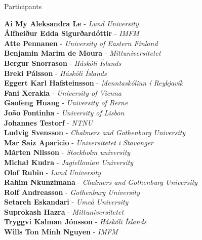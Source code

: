 \documentclass[12pt, openany, twoside]{report}      %
\begin{document}



\newpage



\newpage



\newpage







\newpage
{}

\noindent
{\LARGE Participants}

\bigskip
\bigskip
\noindent
\textbf{Ai My Aleksandra Le} -
\textit{Lund University}
\\
\textbf{Álfheiður Edda Sigurðardóttir} -
\textit{IMFM}
\\
\textbf{Atte Pennanen} -
\textit{University of Eastern Finland}
\\
\textbf{Benjamin Marim de Moura} -
\textit{Mittuniversitetet}
\\
\textbf{Bergur Snorrason} -
\textit{Háskóli Íslands}
\\
\textbf{Breki Pálsson} -
\textit{Háskóli Íslands}
\\
\textbf{Eggert Karl Hafsteinsson} -
\textit{Menntaskólinn í Reykjavík}
\\
\textbf{Fani Xerakia} -
\textit{University of Vienna}
\\
\textbf{Gaofeng Huang} -
\textit{University of Berne}
\\
\textbf{João Fontinha} -
\textit{University of Lisbon}
\\
\textbf{Johannes Testorf} -
\textit{NTNU}
\\
\textbf{Ludvig Svensson} -
\textit{Chalmers and Gothenburg University}
\\
\textbf{Mar Saiz Aparicio} -
\textit{Universitetet i Stavanger}
\\
\textbf{Mårten Nilsson} -
\textit{Stockholm university}
\\
\textbf{Michał Kudra} -
\textit{Jagiellonian University}
\\
\textbf{Olof Rubin} -
\textit{Lund University}
\\
\textbf{Rahim Nkunzimana} -
\textit{Chalmers and Gothenburg University}
\\
\textbf{Rolf Andreasson} -
\textit{Gothenburg University}
\\
\textbf{Setareh Eskandari} -
\textit{Umeå University}
\\
\textbf{Suprokash Hazra} -
\textit{Mittuniversitetet}
\\
\textbf{Tryggvi Kalman Jónsson} -
\textit{Háskóli Íslands}
\\
\textbf{Wills Ton Minh Nguyen} -
\textit{IMFM}
\restoregeometry
\end{document}
